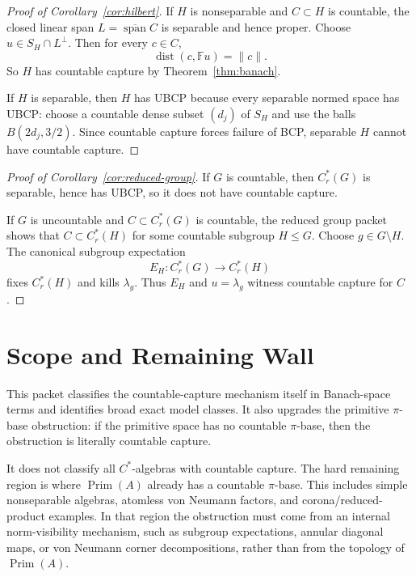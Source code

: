 \documentclass[11pt]{article}
\newcommand{\F}{\mathbb F}
\newcommand{\Prim}{\operatorname{Prim}}
\newcommand{\dist}{\operatorname{dist}}
\newcommand{\Cr}{C^*_r}
\begin{document}
\begin{proof}[Proof of Corollary~\ref{cor:hilbert}]
If \(H\) is nonseparable and \(C\subset H\) is countable, the closed linear
span \(L=\overline{\operatorname{span}}C\) is separable and hence proper.
Choose \(u\in S_H\cap L^\perp\).  Then for every \(c\in C\),
\[
        \dist(c,\F u)=\|c\|.
\]
So \(H\) has countable capture by Theorem~\ref{thm:banach}.

If \(H\) is separable, then \(H\) has UBCP because every separable normed
space has UBCP: choose a countable dense subset \((d_j)\) of \(S_H\) and use
the balls \(B(2d_j,3/2)\).  Since countable capture forces failure of BCP,
separable \(H\) cannot have countable capture.
\end{proof}

\begin{proof}[Proof of Corollary~\ref{cor:reduced-group}]
If \(G\) is countable, then \(\Cr(G)\) is separable, hence has UBCP, so it
does not have countable capture.

If \(G\) is uncountable and \(C\subset \Cr(G)\) is countable, the reduced
group packet shows that \(C\subset \Cr(H)\) for some countable subgroup
\(H\le G\).  Choose \(g\in G\setminus H\).  The canonical subgroup
expectation
\[
        E_H:\Cr(G)\to \Cr(H)
\]
fixes \(\Cr(H)\) and kills \(\lambda_g\).  Thus \(E_H\) and
\(u=\lambda_g\) witness countable capture for \(C\).
\end{proof}

\section*{Scope and Remaining Wall}

This packet classifies the countable-capture mechanism itself in Banach-space
terms and identifies broad exact model classes.  It also upgrades the
primitive \(\pi\)-base obstruction: if the primitive space has no countable
\(\pi\)-base, then the obstruction is literally countable capture.

It does not classify all \(C^*\)-algebras with countable capture.  The hard
remaining region is where \(\Prim(A)\) already has a countable \(\pi\)-base.
This includes simple nonseparable algebras, atomless von Neumann factors, and
corona/reduced-product examples.  In that region the obstruction must come
from an internal norm-visibility mechanism, such as subgroup expectations,
annular diagonal maps, or von Neumann corner decompositions, rather than from
the topology of \(\Prim(A)\).
\end{document}
